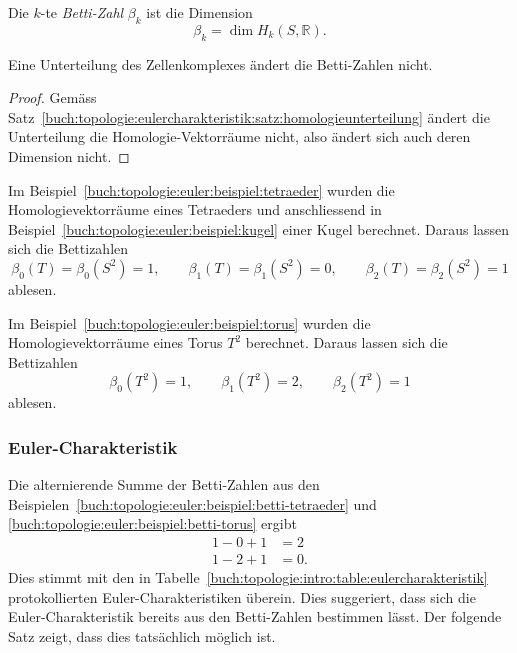 \begin{definition}
Die $k$-te \emph{Betti-Zahl} $\beta_k$ ist die Dimension
\[
\beta_k
=
\dim H_k(S,\mathbb{R}).
\]
\end{definition}

\begin{satz}
Eine Unterteilung des Zellenkomplexes ändert die Betti-Zahlen nicht.
\end{satz}

\begin{proof}
Gemäss Satz~\ref{buch:topologie:eulercharakteristik:satz:homologieunterteilung}
ändert die Unterteilung die Homologie-Vektorräume nicht, also ändert sich
auch deren Dimension nicht.
\end{proof}

\begin{beispiel}
\label{buch:topologie:euler:beispiel:betti-tetraeder}
Im Beispiel~\ref{buch:topologie:euler:beispiel:tetraeder} wurden die 
Homologievektorräume eines Tetraeders und anschliessend in
Beispiel~\ref{buch:topologie:euler:beispiel:kugel} einer Kugel berechnet.
Daraus lassen sich die Bettizahlen
\[
\beta_0(T) = \beta_0(S^2) = 1,\qquad
\beta_1(T) = \beta_1(S^2) = 0,\qquad
\beta_2(T) = \beta_2(S^2) = 1
\]
ablesen.
\end{beispiel}

\begin{beispiel}
\label{buch:topologie:euler:beispiel:betti-torus}
Im Beispiel~\ref{buch:topologie:euler:beispiel:torus} wurden die 
Homologievektorräume eines Torus $T^2$ berechnet.
Daraus lassen sich die Bettizahlen
\[
\beta_0(T^2) = 1,\qquad
\beta_1(T^2) = 2,\qquad
\beta_2(T^2) = 1
\]
ablesen.
\end{beispiel}

%
%
\subsubsection{Euler-Charakteristik}
Die alternierende Summe der Betti-Zahlen aus den
Beispielen~\ref{buch:topologie:euler:beispiel:betti-tetraeder}
und \ref{buch:topologie:euler:beispiel:betti-torus} ergibt
\begin{align*}
1-0+1 &= 2 \\
1-2+1 &= 0.
\end{align*}
Dies stimmt mit den in
Tabelle~\ref{buch:topologie:intro:table:eulercharakteristik}
protokollierten Euler-Charakteristiken überein.
Dies suggeriert, dass sich die Euler-Charakteristik bereits aus
den Betti-Zahlen bestimmen lässt.
Der folgende Satz zeigt, dass dies tatsächlich möglich ist.

